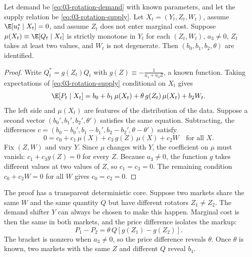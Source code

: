 \begin{proposition}\label{prop:03-rotation}
Let demand be \eqref{eq:03-rotation-demand} with known parameters, and let the supply relation be
\eqref{eq:03-rotation-supply}. Let $X_t = (Y_t, Z_t, W_t)$, assume $\E[u^s_t \mid X_t] = 0$, and assume $Z_t$ does not
enter marginal cost. Suppose $\mu(X_t) \equiv \E[Q_t \mid X_t]$ is strictly monotone in $Y_t$ for each $(Z_t, W_t)$,
$a_3 \neq 0$, $Z_t$ takes at least two values, and $W_t$ is not degenerate. Then $(b_0, b_1, b_2, \theta)$ are identified.
\end{proposition}

\begin{proof}
Write $Q^*_t = g(Z_t)Q_t$ with $g(Z) \equiv -\frac{1}{a_1 + a_3 Z}$, a known function. Taking expectations of
\eqref{eq:03-rotation-supply} conditional on $X_t$ gives
\begin{equation*}
\E[P_t \mid X_t] = b_0 + b_1\, \mu(X_t) + \theta\, g(Z_t)\, \mu(X_t) + b_2 W_t .
\end{equation*}
The left side and $\mu(X_t)$ are features of the distribution of the data. Suppose a second vector $(b_0', b_1', b_2',
\theta')$ satisfies the same equation. Subtracting, the differences $c = (b_0 - b_0', b_1 - b_1', b_2 - b_2', \theta -
\theta')$ satisfy
\begin{equation*}
0 = c_0 + c_1\, \mu(X) + c_3\, g(Z)\, \mu(X) + c_2 W \quad \text{for all } X .
\end{equation*}
Fix $(Z, W)$ and vary $Y$. Since $\mu$ changes with $Y$, the coefficient on $\mu$ must vanish: $c_1 + c_3 g(Z) = 0$ for
every $Z$. Because $a_3 \neq 0$, the function $g$ takes different values at two values of $Z$, so $c_1 = c_3 = 0$. The
remaining condition $c_0 + c_2 W = 0$ for all $W$ gives $c_0 = c_2 = 0$.
\end{proof}

The proof has a transparent deterministic core. Suppose two markets share the same $W$ and the same quantity $Q$ but have
different rotators $Z_1 \neq Z_2$. The demand shifter $Y$ can always be chosen to make this happen. Marginal cost is then
the same in both markets, and the price difference isolates the markup:
\begin{equation*}
P_1 - P_2 = \theta\, Q\left[g(Z_1) - g(Z_2)\right] .
\end{equation*}
The bracket is nonzero when $a_3 \neq 0$, so the price difference reveals $\theta$. Once $\theta$ is known, two markets
with the same $Z$ and different $Q$ reveal $b_1$.

